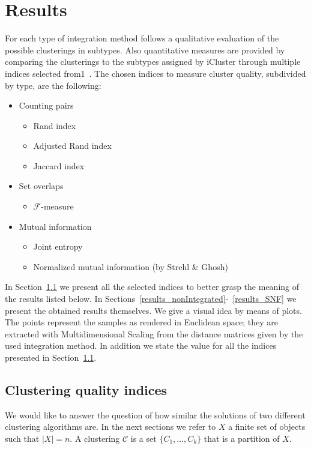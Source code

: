 \chapter{Results}
For each type of integration method follows a qualitative evaluation of the possible clusterings in subtypes. Also quantitative measures are provided by comparing the clusterings to the subtypes assigned by iCluster through multiple indices selected from1~\cite{wagner2007comparing}. The chosen indices to measure cluster quality, subdivided by type, are the following:
\begin{itemize}
    \item Counting pairs
    \begin{itemize}             
        \item Rand index
        \item Adjusted Rand index
        \item Jaccard index
    \end{itemize}
    \item Set overlaps
    \begin{itemize}
        \item $\mathcal{F}$-measure
    \end{itemize}
    \item Mutual information
    \begin{itemize}
        \item Joint entropy
        \item Normalized mutual information (by Strehl \& Ghosh)
    \end{itemize}
\end{itemize}
In Section~\ref{results_indices} we present all the selected indices to better grasp the meaning of the results listed below. In Sections~\ref{results_nonIntegrated}-~\ref{results_SNF} we present the obtained results themselves. We give a visual idea by means of plots. The points represent the samples as rendered in Euclidean space; they are extracted with Multidimensional Scaling from the distance matrices given by the used integration method. In addition we state the value for all the indices presented in Section~\ref{results_indices}.

\section{Clustering quality indices}\label{results_indices}
We would like to answer the question of how similar the solutions of two different clustering algorithms are. In the next sections we refer to $X$ a finite set of objects such that $|X|=n$. A clustering $\mathcal{C}$ is a set $\{C_1,\dots,C_k\}$ that is a partition of $X$.

